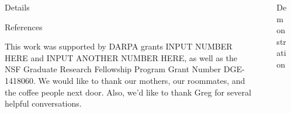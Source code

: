 \documentclass[final]{beamer}
\newlength{\sepwidth}
\newlength{\colwidth}
\newcommand{\separatorcolumn}{\begin{column}{\sepwidth}\end{column}}
\begin{document}
\begin{frame}[t]
\begin{columns}[t]
\begin{column}{\colwidth}
  \begin{block}{Details}
  \end{block}


  \begin{block}{References}

    \footnotesize{
      This work was supported by DARPA grants INPUT NUMBER HERE and INPUT ANOTHER NUMBER HERE, as well as the NSF Graduate Research Fellowship Program Grant Number DGE-1418060. We would like to thank our mothers, our roommates, and the coffee people next door. Also, we'd like to thank Greg for several helpful conversations.
      
    }

  \end{block}

\end{column}


\separatorcolumn


\begin{column}{\colwidth}

  \begin{block}{Demonstration}
  \end{block}
\end{column}


\separatorcolumn
\end{columns}
\end{frame}
\end{document}

